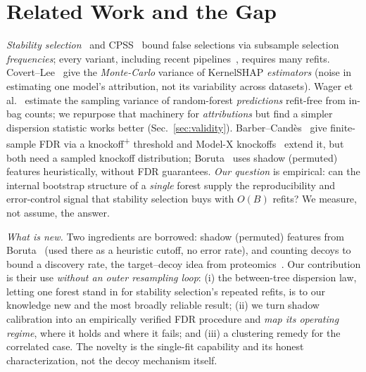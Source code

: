 \documentclass[conference]{IEEEtran}
\begin{document}
\section{Related Work and the Gap}\label{sec:related}
\emph{Stability selection}~\cite{meinshausen2010} and CPSS~\cite{shah2013} bound
false selections via subsample selection \emph{frequencies}; every variant,
including recent pipelines~\cite{robustmodelmaker}, requires many refits.
Covert--Lee~\cite{covert2021} give the \emph{Monte-Carlo} variance of KernelSHAP
\emph{estimators} (noise in estimating one model's attribution, not its
variability across datasets). Wager et al.~\cite{wager2014} estimate the
sampling variance of random-forest \emph{predictions} refit-free from in-bag
counts; we repurpose that machinery for \emph{attributions} but find a simpler
dispersion statistic works better (Sec.~\ref{sec:validity}).
Barber--Cand\`es~\cite{barber2015} give finite-sample FDR via a
knockoff\textsuperscript{+} threshold and Model-X knockoffs~\cite{candes2018}
extend it, but both need a sampled knockoff distribution; Boruta~\cite{boruta}
uses shadow (permuted) features heuristically, without FDR guarantees.
\emph{Our question} is empirical: can the internal bootstrap structure of a
\emph{single} forest supply the reproducibility and error-control signal that
stability selection buys with $O(B)$ refits? We measure, not assume, the answer.

\emph{What is new.} Two ingredients are borrowed: shadow (permuted) features from
Boruta~\cite{boruta} (used there as a heuristic cutoff, no error rate), and
counting decoys to bound a discovery rate, the target--decoy idea from
proteomics~\cite{targetdecoy}. Our contribution is their use \emph{without an
outer resampling loop}: (i) the between-tree dispersion law, letting one forest
stand in for stability selection's repeated refits, is to our knowledge new and
the most broadly reliable result; (ii) we turn shadow calibration into an
empirically verified FDR procedure and \emph{map its operating regime}, where it
holds and where it fails; and (iii) a clustering remedy for the correlated case.
The novelty is the single-fit capability and its honest characterization, not the
decoy mechanism itself.
\end{document}
